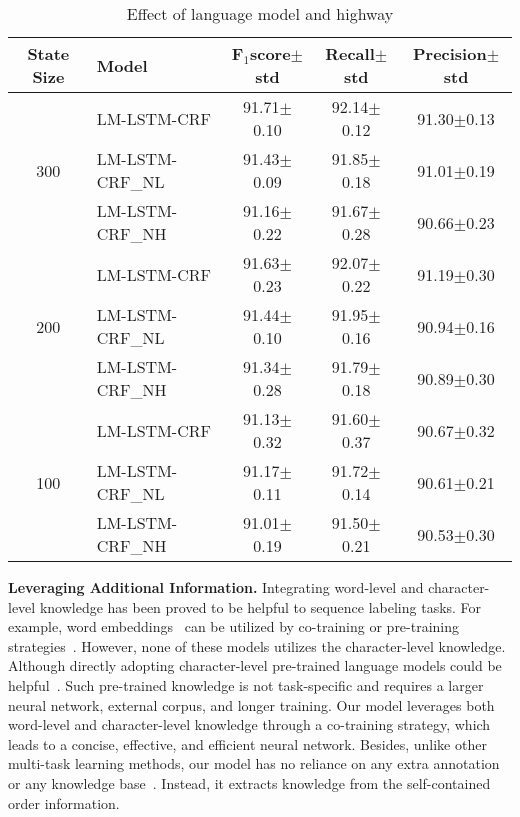 \documentclass[letterpaper]{article} \usepackage{aaai18}  \usepackage{times}  \usepackage{helvet}  \usepackage{courier}  \usepackage{url}  \usepackage{graphicx}  \usepackage{multirow}
\newcommand{\our}{\textsc{LM-LSTM-CRF}\xspace}
\newcommand{\ournl}{\textsc{LM-LSTM-CRF\_NL}\xspace}
\newcommand{\ournh}{\textsc{LM-LSTM-CRF\_NH}\xspace}
\begin{document}
\begin{table}
\center
\scalebox{0.65}
{
\begin{tabular}{c|l|c|c|c}
\hline
State Size & Model & F$_1$score$\pm$std &  Recall$\pm$std &Precision$\pm$std \\
\hline
\hline
\multirow{3}{*}{300} & \our & 91.71$\pm$0.10 &92.14$\pm$0.12 & 91.30$\pm$0.13 \\
\cline{2-5}
& \ournl & 91.43$\pm$0.09 & 91.85$\pm$0.18 & 91.01$\pm$0.19 \\
\cline{2-5}
& \ournh & 91.16$\pm$0.22 & 91.67$\pm$0.28 & 90.66$\pm$0.23 \\
\hline
\hline

\multirow{3}{*}{200} & \our & 91.63$\pm$0.23 &92.07$\pm$0.22 & 91.19$\pm$0.30 \\
\cline{2-5}
& \ournl & 91.44$\pm$0.10 & 91.95$\pm$0.16 & 90.94$\pm$0.16 \\
\cline{2-5}
& \ournh & 91.34$\pm$0.28 & 91.79$\pm$0.18 & 90.89$\pm$0.30 \\
\hline
\hline
\multirow{3}{*}{100} & \our & 91.13$\pm$0.32 &91.60$\pm$0.37 & 90.67$\pm$0.32 \\
\cline{2-5}
& \ournl & 91.17$\pm$0.11 & 91.72$\pm$0.14 & 90.61$\pm$0.21 \\
\cline{2-5}
& \ournh & 91.01$\pm$0.19 & 91.50$\pm$0.21 & 90.53$\pm$0.30 \\
\hline

\end{tabular}
}
\caption{Effect of language model and highway}\label{tbl:hw}
\end{table}

\noindent\textbf{Leveraging Additional Information.}
Integrating word-level and character-level knowledge has been proved to be helpful to sequence labeling tasks.
For example, word embeddings~\cite{mikolov2013distributed,pennington2014glove} can be utilized by co-training or pre-training strategies~\cite{2017arXiv170700166L,2016naacl}.
However, none of these models utilizes the character-level knowledge.
Although directly adopting character-level pre-trained language models could be helpful~\cite{peters2017semi}.
Such pre-trained knowledge is not task-specific and requires a larger neural network, external corpus, and longer training. 
Our model leverages both word-level and character-level knowledge through a co-training strategy, which leads to a concise, effective, and efficient neural network.
Besides, unlike other multi-task learning methods, our model has no reliance on any extra annotation~\cite{peters2017semi} or any knowledge base~\cite{shang2017automated}. 
Instead, it extracts knowledge from the self-contained order information.
\end{document}
